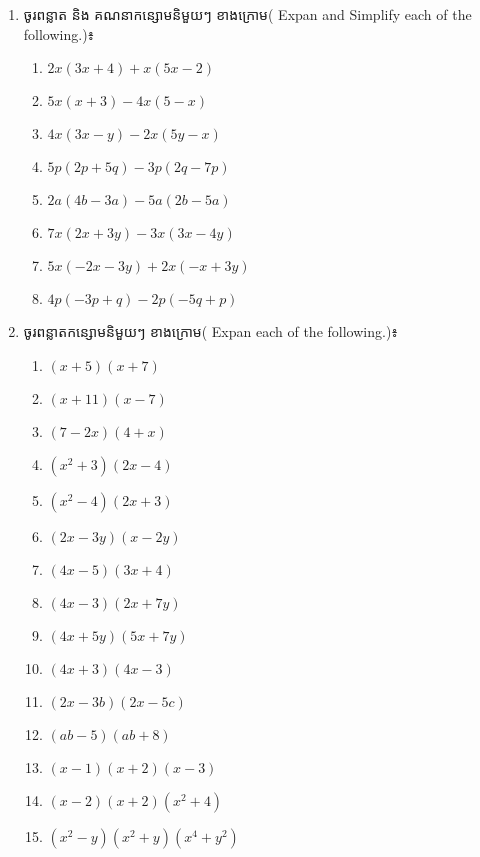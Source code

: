 \begin{enumerate}
\item   ចូរពន្លាត និង គណនាកន្សោមនិមួយៗ ខាងក្រោម( Expan and Simplify  each of the following.)៖
\begin{multicols}{2}
\begin{enumerate}[label=\alph*.]
\item $2x(3x+4)+x(5x-2)$
\item $5x(x+3)-4x(5-x)$
\item $4x(3x-y)-2x(5y-x)$
\item $5p(2p+5q)-3p(2q-7p)$
\item $2a(4b-3a)-5a(2b-5a)$
\item $7x(2x+3y)-3x(3x-4y)$
\item $5x(-2x-3y)+2x(-x+3y)$
\item $4p(-3p+q)-2p(-5q+p)$
\end{enumerate}
\end{multicols}
\item  ចូរពន្លាតកន្សោមនិមួយៗ ខាងក្រោម( Expan each of the following.)៖
\begin{multicols}{2}
\begin{enumerate}[label=\alph*.]
\item $(x+5)(x+7)$
\item $(x+11)(x-7)$
\item $(7-2x)(4+x)$
\item $(x^2+3)(2x-4)$
\item $(x^2-4)(2x+3)$
\item $(2x-3y)(x-2y)$
\item $(4x-5)(3x+4)$
\item $(4x-3)(2x+7y)$
\item $(4x+5y)(5x+7y)$
\item $(4x+3)(4x-3)$
\item $(2x-3b)(2x-5c)$
\item $(ab-5)(ab+8)$
\item $(x-1)(x+2)(x-3)$
\item $(x-2)(x+2)(x^2+4)$
\item $(x^2-y)(x^2+y)(x^4+y^2)$
\end{enumerate}
\end{multicols}


\end{enumerate}
